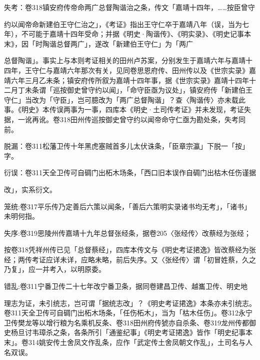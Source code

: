 失考：卷318镇安府传帝命两广总督陶谐治之条，传文「嘉靖十四年，……按臣曾守

\begin{BookQuote}
约以闻帝命新建伯王守仁治之」，《考证》指出王守仁卒于嘉靖八年（误，当为七年），不可能于嘉靖十四年受命；并据《明史·陶谐传》、《明实录》、《明史记事本末》，因「时陶谐总督两广」，遂改「新建伯王守仁」为「两广
\end{BookQuote}

\vfill
\begin{BookNotes}
\end{BookNotes}

\begin{BookQuote}
总督陶谐」。事实上与本则考证相关的田州卢苏案，分别发生于嘉靖六年与嘉靖十四年，王守仁与嘉靖六年那次有关，见同卷思恩府传、田州传以及《世宗实录》嘉靖六年三月乙未条；镇安府传所叙为嘉靖十四年事，据《世宗实录》嘉靖十四年十二月丁未条谓「巡按御史曾守约以闻」，「命守臣亟为议处」，镇安府传「新建伯王守仁」当改为「守臣」，岂可臆改为「两广总督陶谐」？查〈陶谐传〉亦未载此事。《明史》本传误两事为一事，四库本《明史·土司传考证》并未发现，考证失据，一讹再讹。卷318田州传巡按御史曾守约以闻帝命守仁亟为勘处条，失考同前。
\end{BookQuote}

脱漏：卷311松藩卫传十年黑虎塞贼首多儿太伏诛条，「臣章宗瀛」下脱一「按」字。

衍误：卷311天全卫传可自碉门出柘木场条，「西口旧本误作自碉门出枯木任伤谨据

\begin{BookQuote}
改」，实系衍文。
\end{BookQuote}

笼统:卷317平乐传乃定善后六策以闻条，「善后六策明实录诸书均无考」，「诸书」未明何指。

失序:卷319思陵州传嘉靖十九年总督张经条，据卷205〈张经传〉改蔡经为张经；

\begin{BookQuote}
按卷318凭祥州传已见「总督蔡经」，四库本传文与《明史考证捃逸》皆改蔡经为张经；两传考证应详未详，应略未略，前后失序。又〈张经传〉谓「初冒姓蔡，久之乃复」，应一并考入，以明原委。
\end{BookQuote}

错乱:卷311宁番卫传二十七年改宁番卫条，据同卷建昌卫传、越巂卫传、明史地

\begin{BookQuote}
理志为证，未引统志，岂可谓「据统志改」？《明史考证捃逸》本条亦未引统志。卷311天全卫传可自碉门出柘木场条，「任伤柘木」，当为「枯木任伤」。卷312永宁卫传樊龙等以增行粮为名乘机反条、卷318田州府传猇亦自杀条、卷319龙州传都御史杨旦讨韦璋杀之条，各条所引「通鉴纪事」《明史考证捃逸》皆作「明史纪事本末」。卷314姚安传土舍凤文作乱条，应作「武定传土舍凤朝文作乱」，土司名与人名双误。
\end{BookQuote}


